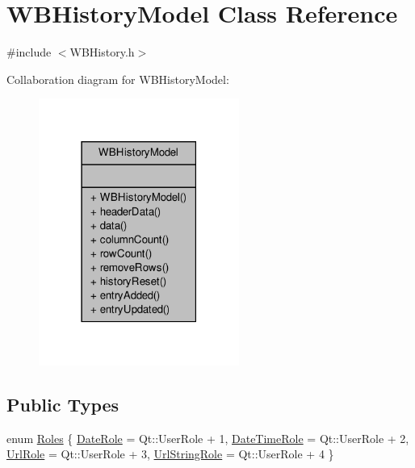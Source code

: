 \hypertarget{class_w_b_history_model}{\section{W\-B\-History\-Model Class Reference}
\label{df/dac/class_w_b_history_model}
}


{\ttfamily \#include $<$W\-B\-History.\-h$>$}



Collaboration diagram for W\-B\-History\-Model\-:
\nopagebreak
\begin{figure}[H]
\begin{center}
\leavevmode
\includegraphics[width=186pt]{d0/d58/class_w_b_history_model__coll__graph}
\end{center}
\end{figure}
\subsection*{Public Types}
\begin{DoxyCompactItemize}
\item 
enum \hyperlink{class_w_b_history_model_a898ccbc40f3547db69e302996901723a}{Roles} \{ \hyperlink{class_w_b_history_model_a898ccbc40f3547db69e302996901723aa21e0ebb4102bbd1b564cefd80e2f4bf0}{Date\-Role} =  Qt\-:\-:User\-Role + 1, 
\hyperlink{class_w_b_history_model_a898ccbc40f3547db69e302996901723aa2a1895e7f09208d01fc26fe7d120bd86}{Date\-Time\-Role} =  Qt\-:\-:User\-Role + 2, 
\hyperlink{class_w_b_history_model_a898ccbc40f3547db69e302996901723aa6a0df8a211fcd913899873dd290a050c}{Url\-Role} =  Qt\-:\-:User\-Role + 3, 
\hyperlink{class_w_b_history_model_a898ccbc40f3547db69e302996901723aa6e15164773a727795cf597160dc02bbb}{Url\-String\-Role} =  Qt\-:\-:User\-Role + 4
 \}
\end{DoxyCompactItemize}
